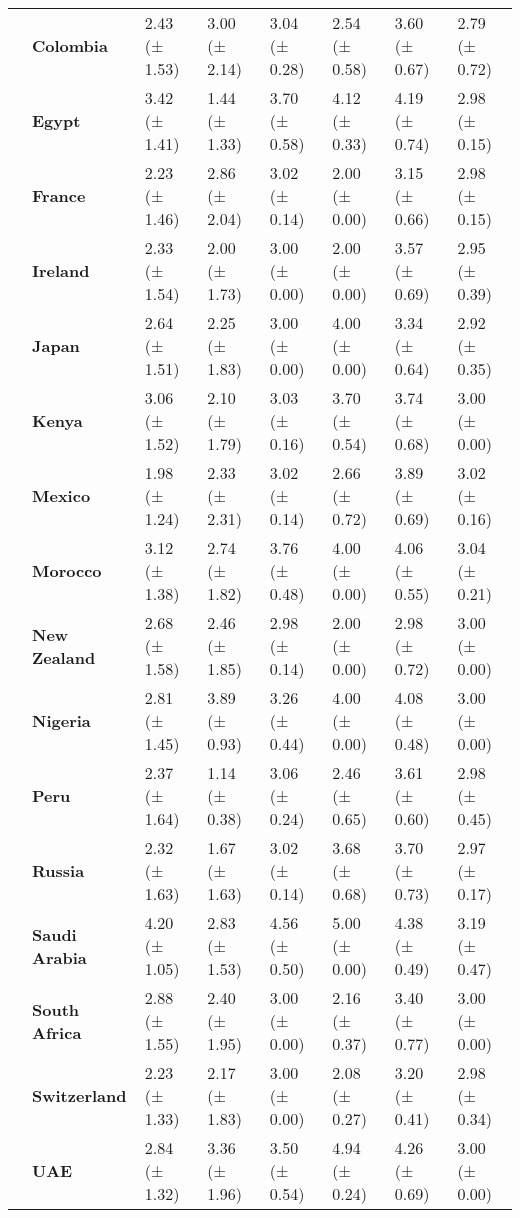 \begin{longtable}{llllllll}
\textbf{} & \textbf{Colombia} & 2.43 (± 1.53) & 3.00 (± 2.14) & 3.04 (± 0.28) & 2.54 (± 0.58) & 3.60 (± 0.67) & 2.79 (± 0.72) \\
\textbf{} & \textbf{Egypt} & 3.42 (± 1.41) & 1.44 (± 1.33) & 3.70 (± 0.58) & 4.12 (± 0.33) & 4.19 (± 0.74) & 2.98 (± 0.15) \\
\textbf{} & \textbf{France} & 2.23 (± 1.46) & 2.86 (± 2.04) & 3.02 (± 0.14) & 2.00 (± 0.00) & 3.15 (± 0.66) & 2.98 (± 0.15) \\
\textbf{} & \textbf{Ireland} & 2.33 (± 1.54) & 2.00 (± 1.73) & 3.00 (± 0.00) & 2.00 (± 0.00) & 3.57 (± 0.69) & 2.95 (± 0.39) \\
\textbf{} & \textbf{Japan} & 2.64 (± 1.51) & 2.25 (± 1.83) & 3.00 (± 0.00) & 4.00 (± 0.00) & 3.34 (± 0.64) & 2.92 (± 0.35) \\
\textbf{} & \textbf{Kenya} & 3.06 (± 1.52) & 2.10 (± 1.79) & 3.03 (± 0.16) & 3.70 (± 0.54) & 3.74 (± 0.68) & 3.00 (± 0.00) \\
\textbf{} & \textbf{Mexico} & 1.98 (± 1.24) & 2.33 (± 2.31) & 3.02 (± 0.14) & 2.66 (± 0.72) & 3.89 (± 0.69) & 3.02 (± 0.16) \\
\textbf{} & \textbf{Morocco} & 3.12 (± 1.38) & 2.74 (± 1.82) & 3.76 (± 0.48) & 4.00 (± 0.00) & 4.06 (± 0.55) & 3.04 (± 0.21) \\
\textbf{} & \textbf{New Zealand} & 2.68 (± 1.58) & 2.46 (± 1.85) & 2.98 (± 0.14) & 2.00 (± 0.00) & 2.98 (± 0.72) & 3.00 (± 0.00) \\
\textbf{} & \textbf{Nigeria} & 2.81 (± 1.45) & 3.89 (± 0.93) & 3.26 (± 0.44) & 4.00 (± 0.00) & 4.08 (± 0.48) & 3.00 (± 0.00) \\
\textbf{} & \textbf{Peru} & 2.37 (± 1.64) & 1.14 (± 0.38) & 3.06 (± 0.24) & 2.46 (± 0.65) & 3.61 (± 0.60) & 2.98 (± 0.45) \\
\textbf{} & \textbf{Russia} & 2.32 (± 1.63) & 1.67 (± 1.63) & 3.02 (± 0.14) & 3.68 (± 0.68) & 3.70 (± 0.73) & 2.97 (± 0.17) \\
\textbf{} & \textbf{Saudi Arabia} & 4.20 (± 1.05) & 2.83 (± 1.53) & 4.56 (± 0.50) & 5.00 (± 0.00) & 4.38 (± 0.49) & 3.19 (± 0.47) \\
\textbf{} & \textbf{South Africa} & 2.88 (± 1.55) & 2.40 (± 1.95) & 3.00 (± 0.00) & 2.16 (± 0.37) & 3.40 (± 0.77) & 3.00 (± 0.00) \\
\textbf{} & \textbf{Switzerland} & 2.23 (± 1.33) & 2.17 (± 1.83) & 3.00 (± 0.00) & 2.08 (± 0.27) & 3.20 (± 0.41) & 2.98 (± 0.34) \\
\textbf{} & \textbf{UAE} & 2.84 (± 1.32) & 3.36 (± 1.96) & 3.50 (± 0.54) & 4.94 (± 0.24) & 4.26 (± 0.69) & 3.00 (± 0.00) \\
\cline{1-8}
\end{longtable}
